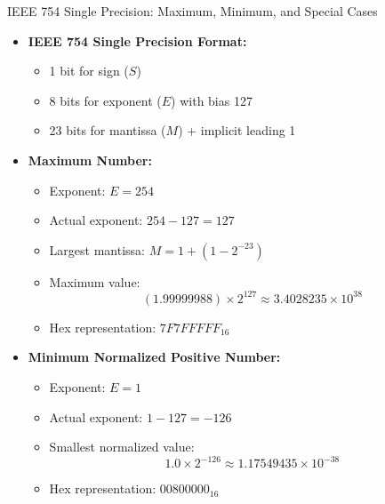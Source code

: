 \documentclass[aspectratio=169]{beamer}
\begin{document}
\begin{frame}[allowframebreaks]{IEEE 754 Single Precision: Maximum, Minimum, and Special Cases}
    \begin{itemize}
        \item \textbf{IEEE 754 Single Precision Format:}
        \begin{itemize}
            \item 1 bit for sign (\(S\))
            \item 8 bits for exponent (\(E\)) with bias 127
            \item 23 bits for mantissa (\(M\)) + implicit leading 1
        \end{itemize}
        
        \framebreak
        
        \item \textbf{Maximum Number:}
        \begin{itemize}
            \item Exponent: \( E = 254 \) 
            \item Actual exponent: \( 254 - 127 = 127 \)
            \item Largest mantissa: \( M = 1 + (1 - 2^{-23}) \)
            \item Maximum value:
            \[
            (1.99999988) \times 2^{127} \approx 3.4028235 \times 10^{38}
            \]
            \item Hex representation: \( 7F7FFFFF_{16} \)
        \end{itemize}

        \framebreak
        
        \item \textbf{Minimum Normalized Positive Number:}
        \begin{itemize}
            \item Exponent: \( E = 1 \)
            \item Actual exponent: \( 1 - 127 = -126 \)
            \item Smallest normalized value:
            \[
            1.0 \times 2^{-126} \approx 1.17549435 \times 10^{-38}
            \]
            \item Hex representation: \( 00800000_{16} \)
        \end{itemize}

        \framebreak



\end{itemize}
\end{frame}
\end{document}
